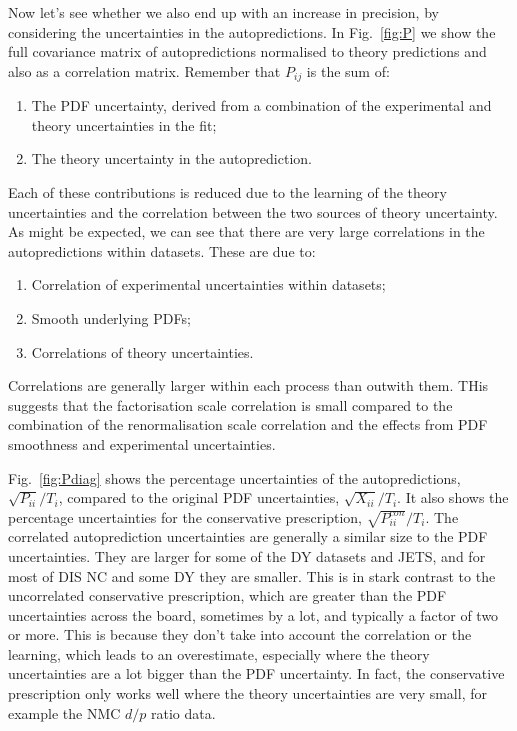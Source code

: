 Now let's see whether we also end up with an increase in precision, by considering the uncertainties in the autopredictions. In Fig.~\ref{fig:P} we show the full covariance matrix of autopredictions normalised to theory predictions and also as a correlation matrix. Remember that $P_{ij}$ is the sum of:
\begin{enumerate}
\item The PDF uncertainty, derived from a combination of the experimental and theory uncertainties in the fit;
\item The theory uncertainty in the autoprediction.
\end{enumerate}
Each of these contributions is reduced due to the learning of the theory uncertainties and the correlation between the two sources of theory uncertainty. As might be expected, we can see that there are very large correlations in the autopredictions within datasets. These are due to:
\begin{enumerate}
\item Correlation of experimental uncertainties within datasets;
\item Smooth underlying PDFs;
\item Correlations of theory uncertainties.
\end{enumerate}
Correlations are generally larger within each process than outwith them. THis suggests that the factorisation scale correlation is small compared to the combination of the renormalisation scale correlation and the effects from PDF smoothness and experimental uncertainties.

Fig.~\ref{fig:Pdiag} shows the percentage uncertainties of the autopredictions, $\sqrt{P_{ii}}/T_i$, compared to the original PDF uncertainties, $\sqrt{X_{ii}}/T_i$. It also shows the percentage uncertainties for the conservative prescription, $\sqrt{P^{con}_{ii}}/T_i$. The correlated autoprediction uncertainties are generally a similar size to the PDF uncertainties. They are larger for some of the DY datasets and JETS, and for most of DIS NC and some DY they are smaller. This is in stark contrast to the uncorrelated conservative prescription, which are greater than the PDF uncertainties across the board, sometimes by a lot, and typically a factor of two or more. This is because they don't take into account the correlation or the learning, which leads to an overestimate, especially where the theory uncertainties are a lot bigger than the PDF uncertainty. In fact, the conservative prescription only works well where the theory uncertainties are very small, for example the NMC $d/p$ ratio data. 

